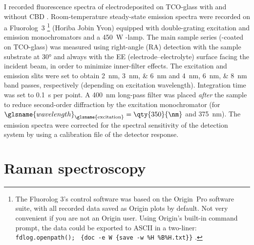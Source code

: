 \documentclass[draft,webedition,openright,titles,swedish,english]{LuaUUThesis}\usepackage[]{graphicx}\usepackage[]{xcolor}
\begin{document}
I recorded fluorescence spectra of electrodeposited   on
\gls{TCO}-glass with and without \gls{CBD} .
Room-temperature steady-state emission spectra were recorded on a Fluorolog~3%
\footnote{%
   The Fluorolog 3's control software was based on the Origin~Pro software suite,
   with all recorded data saved as Origin plots by default. Not very convenient
   if you are not an Origin user.
   Using Origin's built-in command prompt, the data could be exported to ASCII
   in a two-liner: \texttt{fdlog.openpath(); }%
   \verb+{doc -e W {save -w %H %B%H.txt}}+%
   .%
}
(Horiba Jobin Yvon)
equipped with double-grating excitation and emission monochromators and a
\qty{450}{\watt} -lamp.
The main sample series (-coated   on \gls{TCO}-glass)
was measured using right-angle (RA) detection with the sample substrate at \ang{30}
and always with the EE (electrode--electrolyte) surface facing the incident beam,
in order to minimize inner-filter effects.
The excitation and emission slits were set to obtain \qtylist{2;3;6}{\nm} and
\qtylist{4;6;8}{\nm} band passes, respectively (depending on excitation wavelength).
Integration time was set to \qty{0.1}{\second} per point.
A \qty{400}{\nm} long-pass filter was placed \emph{after} the sample to reduce
second-order diffraction by the excitation monochromator
(for $\glsname{wavelength}_\text{\glsname{excitation}}=\qty{350}{\nm}$ and \qty{375}{\nm}).
The emission spectra were corrected for the spectral sensitivity of the
detection system by using a calibration file of the detector response.





\section{Raman spectroscopy}
\label{methods:raman-spectroscopy}
\end{document}
